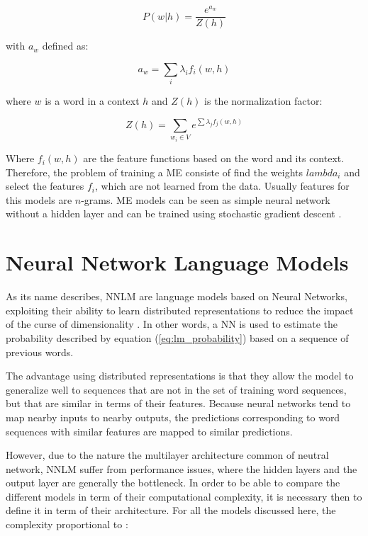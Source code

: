 \begin{equation}
  \label{eq:max-ent-prob}
   P(w|h) = \frac{e^{a_w}}{Z(h)}
\end{equation}

with $a_w$ defined as:

\begin{equation}
  \label{eq:max-ent-pro-sub1}
  a_w = \sum_{i}{\lambda_i f_i(w,h)} 
\end{equation}

where $w$ is a word in a context $h$ and $Z(h)$ is  the normalization factor:

\begin{equation}
  \label{eq:max-ent-prob-sub2}
  Z(h) = \sum_{w_i \in V}{e^{\sum{\lambda_{j} f_j(w,h)}}} 
\end{equation}

Where $f_i(w,h)$ are  the feature functions based on the word and its
context. Therefore, the problem of training a  \ac{ME} consiste of  find the
weights  $lambda_i$ and select the features $f_i$, which are not learned from
the data. Usually features for this models are $n$-grams. \ac{ME} models can
be seen as simple neural network without a hidden layer and can be trained
using stochastic gradient descent \cite{Bishop:1995:NNP:525960, mikolovphd2012}.




\section{Neural Network Language Models}
\label{sec:nnlms-intro}

As its name describes,  \ac{NNLM} are  language models based on Neural Networks, exploiting their
ability to learn distributed representations to reduce the impact of the
curse of dimensionality \cite{Bengio:2008}. In other words, a \ac{NN} is
used to estimate the probability described  by equation (\ref{eq:lm_probability}) based on a sequence of
previous words.

The advantage  using  distributed representations  is that they allow
the model to generalize well to sequences that are not in the set of training
word sequences, but that are similar in terms of their features. Because neural networks tend to map nearby inputs
to nearby outputs, the predictions corresponding to word sequences with
similar features are mapped to similar predictions. \cite{Bengio:2008,Bengio:2003:NPL:944919.944966}

However, due to the nature the multilayer architecture common of neutral
network, \ac{NNLM}  suffer from  
performance issues, where the hidden layers and the output layer are
generally the bottleneck. In order to be able to compare the different
models in term of their computational complexity, it is necessary then to define it in
term of their architecture. For all the models discussed here, the  complexity proportional to \cite{DBLP:journals/corr/abs-1301-3781}:

